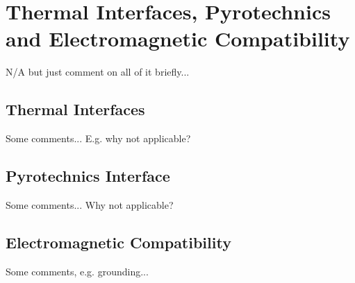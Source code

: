 \chapter{Thermal Interfaces, Pyrotechnics and Electromagnetic Compatibility}
\label{chap:thermal_pyro_emc}

N/A but just comment on all of it briefly...

\section{Thermal Interfaces}

Some comments... E.g. why not applicable?

\section{Pyrotechnics Interface}

Some comments... Why not applicable?

\section{Electromagnetic Compatibility}

Some comments, e.g. grounding...